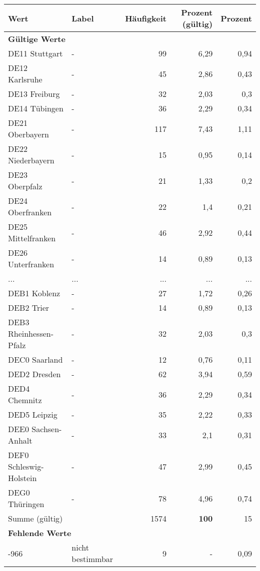      \begin{longtable}{Xlrrr}
     \toprule
     \textbf{Wert} & \textbf{Label} & \textbf{Häufigkeit} & \textbf{Prozent (gültig)} & \textbf{Prozent} \\
     \endhead
     \midrule
     \multicolumn{5}{l}{\textbf{Gültige Werte}}\\
        \multicolumn{1}{X}{DE11 Stuttgart} & - & 99 & 6,29 & 0,94 \\
        \multicolumn{1}{X}{DE12 Karlsruhe} & - & 45 & 2,86 & 0,43 \\
        \multicolumn{1}{X}{DE13 Freiburg} & - & 32 & 2,03 & 0,3 \\
        \multicolumn{1}{X}{DE14 Tübingen} & - & 36 & 2,29 & 0,34 \\
        \multicolumn{1}{X}{DE21 Oberbayern} & - & 117 & 7,43 & 1,11 \\
        \multicolumn{1}{X}{DE22 Niederbayern} & - & 15 & 0,95 & 0,14 \\
        \multicolumn{1}{X}{DE23 Oberpfalz} & - & 21 & 1,33 & 0,2 \\
        \multicolumn{1}{X}{DE24 Oberfranken} & - & 22 & 1,4 & 0,21 \\
        \multicolumn{1}{X}{DE25 Mittelfranken} & - & 46 & 2,92 & 0,44 \\
        \multicolumn{1}{X}{DE26 Unterfranken} & - & 14 & 0,89 & 0,13 \\
       ... & ... & ... & ... & ... \\
        \multicolumn{1}{X}{DEB1 Koblenz} & - & 27 & 1,72 & 0,26 \\
        \multicolumn{1}{X}{DEB2 Trier} & - & 14 & 0,89 & 0,13 \\
        \multicolumn{1}{X}{DEB3 Rheinhessen-Pfalz} & - & 32 & 2,03 & 0,3 \\
        \multicolumn{1}{X}{DEC0 Saarland} & - & 12 & 0,76 & 0,11 \\
        \multicolumn{1}{X}{DED2 Dresden} & - & 62 & 3,94 & 0,59 \\
        \multicolumn{1}{X}{DED4 Chemnitz} & - & 36 & 2,29 & 0,34 \\
        \multicolumn{1}{X}{DED5 Leipzig} & - & 35 & 2,22 & 0,33 \\
        \multicolumn{1}{X}{DEE0 Sachsen-Anhalt} & - & 33 & 2,1 & 0,31 \\
        \multicolumn{1}{X}{DEF0 Schleswig-Holstein} & - & 47 & 2,99 & 0,45 \\
        \multicolumn{1}{X}{DEG0 Thüringen} & - & 78 & 4,96 & 0,74 \\
     \midrule
      \multicolumn{2}{l}{Summe (gültig)} & 1574 &
      \textbf{100} &
         15 \\
     \multicolumn{5}{l}{\textbf{Fehlende Werte}}\\
       -966 & nicht bestimmbar & 9 & - & 0,09 \\


\end{longtable}
